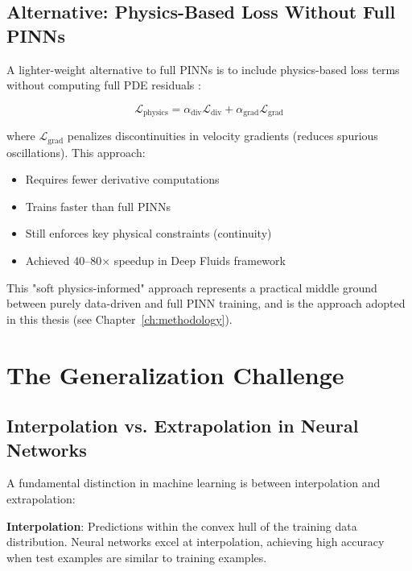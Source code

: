 \subsection{Alternative: Physics-Based Loss Without Full PINNs}

A lighter-weight alternative to full PINNs is to include physics-based loss terms without computing full PDE residuals \cite{thuerey2020deep}:

\begin{equation}
\mathcal{L}_{\text{physics}} = \alpha_{\text{div}} \mathcal{L}_{\text{div}} + \alpha_{\text{grad}} \mathcal{L}_{\text{grad}}
\end{equation}

where $\mathcal{L}_{\text{grad}}$ penalizes discontinuities in velocity gradients (reduces spurious oscillations). This approach:
\begin{itemize}
    \item Requires fewer derivative computations
    \item Trains faster than full PINNs
    \item Still enforces key physical constraints (continuity)
    \item Achieved 40--80$\times$ speedup in Deep Fluids framework \cite{thuerey2020deep}
\end{itemize}

This "soft physics-informed" approach represents a practical middle ground between purely data-driven and full PINN training, and is the approach adopted in this thesis (see Chapter~\ref{ch:methodology}).

\section{The Generalization Challenge}
\label{sec:generalization}

\subsection{Interpolation vs. Extrapolation in Neural Networks}

A fundamental distinction in machine learning is between interpolation and extrapolation:

\textbf{Interpolation}: Predictions within the convex hull of the training data distribution. Neural networks excel at interpolation, achieving high accuracy when test examples are similar to training examples.

